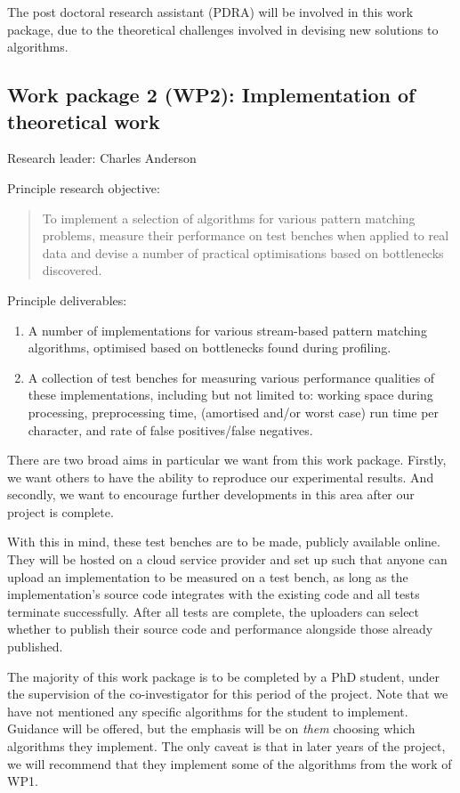 \documentclass[a4paper,11pt]{article}
\begin{document}
    The post doctoral research assistant (PDRA) will be involved in this work package, due to the theoretical challenges involved in devising new solutions to algorithms.

    \subsection*{Work package 2 (WP2): Implementation of theoretical work}

    Research leader: Charles Anderson

    Principle research objective:
    \begin{quote}
        To implement a selection of algorithms for various pattern matching problems, measure their performance on test benches when applied to real data and devise a number of practical optimisations based on bottlenecks discovered.
    \end{quote}

    Principle deliverables:
    \begin{enumerate}
        \item A number of implementations for various stream-based pattern matching algorithms, optimised based on bottlenecks found during profiling.
        \item A collection of test benches for measuring various performance qualities of these implementations, including but not limited to: working space during processing, preprocessing time, (amortised and/or worst case) run time per character, and rate of false positives/false negatives.
    \end{enumerate}

    There are two broad aims in particular we want from this work package. Firstly, we want others to have the ability to reproduce our experimental results. And secondly, we want to encourage further developments in this area after our project is complete.

    With this in mind, these test benches are to be made, publicly available online. They will be hosted on a cloud service provider and set up such that anyone can upload an implementation to be measured on a test bench, as long as the implementation's source code integrates with the existing code and all tests terminate successfully. After all tests are complete, the uploaders can select whether to publish their source code and performance alongside those already published.

    The majority of this work package is to be completed by a PhD student, under the supervision of the co-investigator for this period of the project. Note that we have not mentioned any specific algorithms for the student to implement. Guidance will be offered, but the emphasis will be on \textit{them} choosing which algorithms they implement. The only caveat is that in later years of the project, we will recommend that they implement some of the algorithms from the work of WP1.
\end{document}
